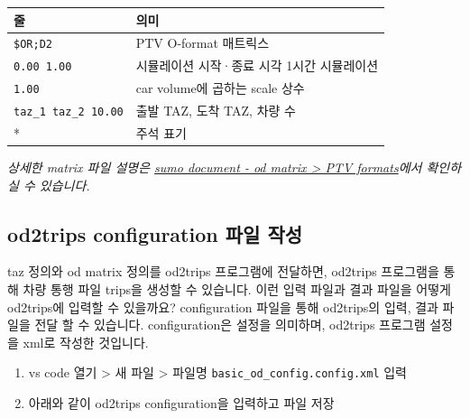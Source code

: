 \documentclass[
  letterpaper,
  DIV=11,
  numbers=noendperiod]{scrreprt}
\newcounter{none} %
\providecommand{\tightlist}{%
  \setlength{\itemsep}{0pt}\setlength{\parskip}{0pt}}
\begin{document}
{\def\LTcaptype{none} %
\begin{longtable}[]{@{}ll@{}}
\toprule\noalign{}
줄 & 의미 \\
\midrule\noalign{}
\endhead
\bottomrule\noalign{}
\endlastfoot
\texttt{\$OR;D2} & PTV O-format 매트릭스 \\
\texttt{0.00\ 1.00} & 시뮬레이션 시작·종료 시각 1시간 시뮬레이션 \\
\texttt{1.00} & car volume에 곱하는 scale 상수 \\
\texttt{taz\_1\ taz\_2\ 10.00} & 출발 TAZ, 도착 TAZ, 차량 수 \\
* & 주석 표기 \\
\end{longtable}
}

\emph{상세한 matrix 파일 설명은
\href{https://sumo.dlr.de/docs/Demand/Importing_O/D_Matrices.html}{sumo
document - od matrix \textgreater{} PTV formats}에서 확인하실 수
있습니다.}

\subsection{od2trips configuration 파일
작성}\label{od2trips-configuration-uxd30cuxc77c-uxc791uxc131}

taz 정의와 od matrix 정의를 od2trips 프로그램에 전달하면, od2trips
프로그램을 통해 차량 통행 파일 trips을 생성할 수 있습니다. 이런 입력
파일과 결과 파일을 어떻게 od2trips에 입력할 수 있을까요? configuration
파일을 통해 od2trips의 입력, 결과 파일을 전달 할 수 있습니다.
configuration은 설정을 의미하며, od2trips 프로그램 설정을 xml로 작성한
것입니다.

\begin{enumerate}
\def\labelenumi{\arabic{enumi}.}
\tightlist
\item
  vs code 열기 \textgreater{} 새 파일 \textgreater{} 파일명
  \texttt{basic\_od\_config.config.xml} 입력
\item
  아래와 같이 od2trips configuration을 입력하고 파일 저장
\end{enumerate}
\end{document}
